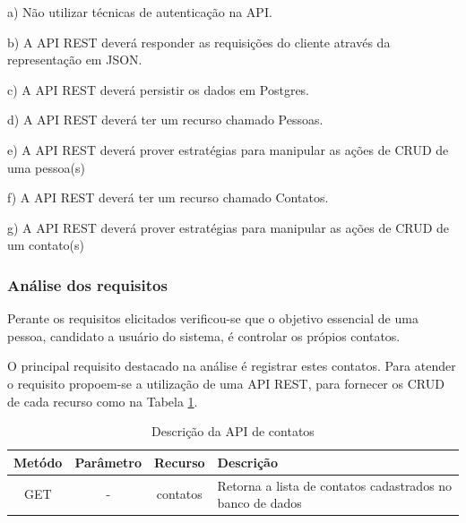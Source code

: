   \begin{compactitem}
    \item[a)] Não utilizar técnicas de autenticação na API.
    \item[b)] A \ac{API} \ac{REST} deverá responder as requisições do cliente através da representação em JSON.
    \item[c)] A \ac{API} \ac{REST} deverá persistir os dados em Postgres.
    \item[d)] A \ac{API} \ac{REST} deverá ter um recurso chamado Pessoas.
    \item[e)] A \ac{API} \ac{REST} deverá prover estratégias para manipular as ações de CRUD de uma pessoa(s)
    \item[f)] A \ac{API} \ac{REST} deverá ter um recurso chamado Contatos.
    \item[g)] A \ac{API} \ac{REST} deverá prover estratégias para manipular as ações de CRUD de um contato(s)
  \end{compactitem}
  
\subsubsection{Análise dos requisitos}
  
  Perante os requisitos elicitados verificou-se que o objetivo essencial de uma pessoa, candidato a usuário
  do sistema, é controlar os própios contatos.
  
  O principal requisito destacado na análise é registrar estes contatos. Para atender o requisito
  propoem-se a utilização de uma \ac{API} \ac{REST}, para fornecer os \ac{CRUD} de cada recurso
  como na Tabela \ref{tab:api-descricao-contato}.
 
  
  \begin{table}[H]
    \centering
    \footnotesize
    \vspace{0.5cm}
    \setlength{\abovecaptionskip}{0pt}
    \setlength{\belowcaptionskip}{0pt}
    \caption[Descrição da API de contatos]{Descrição da API de contatos}
    \label{tab:api-descricao-contato}
    \begin{tabular}{c|c|c|p{8cm}}
      \hline \hline
      Metódo  &	Parâmetro &	Recurso &	Descrição \\
      \hline \hline
      GET	& -	& contatos	& Retorna a lista de contatos 
					  cadastrados no banco de dados \\
      \hline \hline
    \end{tabular}
  \end{table}
  
